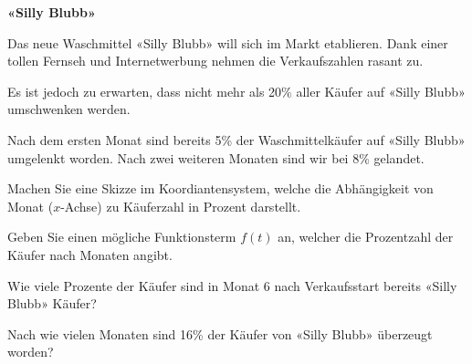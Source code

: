 \bbwActAufgabenNr{} \textbf{«Silly Blubb»}

Das neue Waschmittel «Silly Blubb» will sich im Markt etablieren.
Dank einer tollen Fernseh und Internetwerbung nehmen die
Verkaufszahlen rasant zu.

Es ist jedoch zu erwarten, dass nicht mehr als 20\% aller Käufer auf
«Silly Blubb» umschwenken werden.

Nach dem ersten Monat sind bereits 5\% der Waschmittelkäufer auf
«Silly Blubb» umgelenkt worden. Nach zwei weiteren Monaten sind wir
bei 8\% gelandet.


\begin{bbwAufgabenBlock}
\item Machen Sie eine Skizze im Koordiantensystem, welche die
Abhängigkeit von Monat ($x$-Achse) zu Käuferzahl in Prozent darstellt.


\item Geben Sie einen mögliche Funktionsterm $f(t)$ an, welcher die
Prozentzahl der Käufer nach Monaten angibt.


\item Wie viele Prozente der Käufer sind in Monat 6 nach Verkaufsstart
  bereits «Silly Blubb» Käufer?
  

\item Nach wie vielen Monaten sind 16\% der Käufer von «Silly Blubb»
  überzeugt worden?


\end{bbwAufgabenBlock}


\platzFuerBerechnungenBisEndeSeite{}


\newpage
